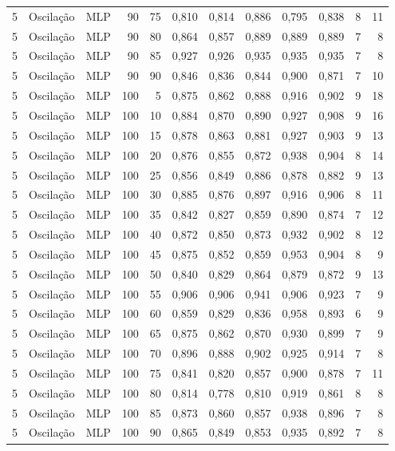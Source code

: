 \begin{longtable}{@{}rllrrrrrrrrr@{}}
5 & Oscilação & MLP & 90 & 75 & 0,810 & 0,814 & 0,886 & 0,795 & 0,838 & 8 & 11 \\
5 & Oscilação & MLP & 90 & 80 & 0,864 & 0,857 & 0,889 & 0,889 & 0,889 & 7 & 8 \\
5 & Oscilação & MLP & 90 & 85 & 0,927 & 0,926 & 0,935 & 0,935 & 0,935 & 7 & 8 \\
5 & Oscilação & MLP & 90 & 90 & 0,846 & 0,836 & 0,844 & 0,900 & 0,871 & 7 & 10 \\
5 & Oscilação & MLP & 100 & 5 & 0,875 & 0,862 & 0,888 & 0,916 & 0,902 & 9 & 18 \\
5 & Oscilação & MLP & 100 & 10 & 0,884 & 0,870 & 0,890 & 0,927 & 0,908 & 9 & 16 \\
5 & Oscilação & MLP & 100 & 15 & 0,878 & 0,863 & 0,881 & 0,927 & 0,903 & 9 & 13 \\
5 & Oscilação & MLP & 100 & 20 & 0,876 & 0,855 & 0,872 & 0,938 & 0,904 & 8 & 14 \\
5 & Oscilação & MLP & 100 & 25 & 0,856 & 0,849 & 0,886 & 0,878 & 0,882 & 9 & 13 \\
5 & Oscilação & MLP & 100 & 30 & 0,885 & 0,876 & 0,897 & 0,916 & 0,906 & 8 & 11 \\
5 & Oscilação & MLP & 100 & 35 & 0,842 & 0,827 & 0,859 & 0,890 & 0,874 & 7 & 12 \\
5 & Oscilação & MLP & 100 & 40 & 0,872 & 0,850 & 0,873 & 0,932 & 0,902 & 8 & 12 \\
5 & Oscilação & MLP & 100 & 45 & 0,875 & 0,852 & 0,859 & 0,953 & 0,904 & 8 & 9 \\
5 & Oscilação & MLP & 100 & 50 & 0,840 & 0,829 & 0,864 & 0,879 & 0,872 & 9 & 13 \\
5 & Oscilação & MLP & 100 & 55 & 0,906 & 0,906 & 0,941 & 0,906 & 0,923 & 7 & 9 \\
5 & Oscilação & MLP & 100 & 60 & 0,859 & 0,829 & 0,836 & 0,958 & 0,893 & 6 & 9 \\
5 & Oscilação & MLP & 100 & 65 & 0,875 & 0,862 & 0,870 & 0,930 & 0,899 & 7 & 9 \\
5 & Oscilação & MLP & 100 & 70 & 0,896 & 0,888 & 0,902 & 0,925 & 0,914 & 7 & 8 \\
5 & Oscilação & MLP & 100 & 75 & 0,841 & 0,820 & 0,857 & 0,900 & 0,878 & 7 & 11 \\
5 & Oscilação & MLP & 100 & 80 & 0,814 & 0,778 & 0,810 & 0,919 & 0,861 & 8 & 8 \\
5 & Oscilação & MLP & 100 & 85 & 0,873 & 0,860 & 0,857 & 0,938 & 0,896 & 7 & 8 \\
5 & Oscilação & MLP & 100 & 90 & 0,865 & 0,849 & 0,853 & 0,935 & 0,892 & 7 & 8 \\

\end{longtable}
